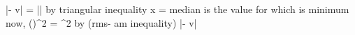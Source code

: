 \left|\mu - v\right| = \left|\right| \leq {}  by triangular inequality
 \leq {} 
x = median is the value for which  is minimum
now, {\Bigg(\Bigg)}^2 \leq {} = \sigma^2 by (rms- am inequality)
\therefore \left|\mu - v\right| \leq \sigma